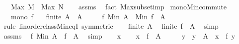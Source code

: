 \begin{isabellebody}
\ \ \ {\isachardoublequoteopen}Max\ M\ {\isasymle}\ Max\ N{\isachardoublequoteclose}\isanewline
%
\isadelimproof
\ \ %
\endisadelimproof
%
\isatagproof
{}\isamarkupfalse%
\ assms\ \isamarkupfalse%
\ {\isacharparenleft}{\kern0pt}fact\ Max{\isachardot}{\kern0pt}subset{\isacharunderscore}{\kern0pt}imp{\isacharparenright}{\kern0pt}%
\endisatagproof
{\isafoldproof}%
%
\isadelimproof
\isanewline
%
\endisadelimproof
\isanewline
{}\isamarkupfalse%
\ mono{\isacharunderscore}{\kern0pt}Min{\isacharunderscore}{\kern0pt}commute{\isacharcolon}{\kern0pt}\isanewline
\ \ \ {\isachardoublequoteopen}mono\ f{\isachardoublequoteclose}\isanewline
\ \ \ {\isachardoublequoteopen}finite\ A{\isachardoublequoteclose}\ \ {\isachardoublequoteopen}A\ {\isasymnoteq}\ {\isacharbraceleft}{\kern0pt}{\isacharbraceright}{\kern0pt}{\isachardoublequoteclose}\isanewline
\ \ \ {\isachardoublequoteopen}f\ {\isacharparenleft}{\kern0pt}Min\ A{\isacharparenright}{\kern0pt}\ {\isacharequal}{\kern0pt}\ Min\ {\isacharparenleft}{\kern0pt}f\ {\isacharbackquote}{\kern0pt}\ A{\isacharparenright}{\kern0pt}{\isachardoublequoteclose}\isanewline
%
\isadelimproof
%
\endisadelimproof
%
\isatagproof
{}\isamarkupfalse%
\ {\isacharparenleft}{\kern0pt}rule\ linorder{\isacharunderscore}{\kern0pt}class{\isachardot}{\kern0pt}Min{\isacharunderscore}{\kern0pt}eqI\ {\isacharbrackleft}{\kern0pt}symmetric{\isacharbrackright}{\kern0pt}{\isacharparenright}{\kern0pt}\isanewline
\ \ \isamarkupfalse%
\ {\isacartoucheopen}finite\ A{\isacartoucheclose}\ \isamarkupfalse%
\ {\isachardoublequoteopen}finite\ {\isacharparenleft}{\kern0pt}f\ {\isacharbackquote}{\kern0pt}\ A{\isacharparenright}{\kern0pt}{\isachardoublequoteclose}\ \isamarkupfalse%
\ simp\isanewline
\ \ \isamarkupfalse%
\ assms\ \isamarkupfalse%
\ {\isachardoublequoteopen}f\ {\isacharparenleft}{\kern0pt}Min\ A{\isacharparenright}{\kern0pt}\ {\isasymin}\ f\ {\isacharbackquote}{\kern0pt}\ A{\isachardoublequoteclose}\ \isamarkupfalse%
\ simp\isanewline
\ \ \isamarkupfalse%
\ x\isanewline
\ \ \isamarkupfalse%
\ {\isachardoublequoteopen}x\ {\isasymin}\ f\ {\isacharbackquote}{\kern0pt}\ A{\isachardoublequoteclose}\isanewline
\ \ \isamarkupfalse%
\ \isamarkupfalse%
\ y\ \ {\isachardoublequoteopen}y\ {\isasymin}\ A{\isachardoublequoteclose}\ \ {\isachardoublequoteopen}x\ {\isacharequal}{\kern0pt}\ f\ y{\isachardoublequoteclose}\ \isacommand{{\isachardot}{\kern0pt}{\isachardot}{\kern0pt}}\isamarkupfalse%

\end{isabellebody}
